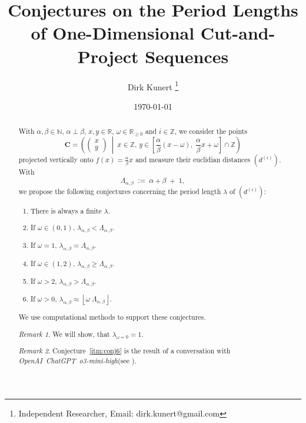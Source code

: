 \documentclass[11pt]{article}
\title{Conjectures on the Period Lengths of One-Dimensional Cut-and-Project Sequences}
\author{Dirk Kunert \thanks{Independent Researcher, Email: dirk.kunert@gmail.com}}
\date{\today}
\theoremstyle{remark}
\newtheorem{remark}{Remark}
\begin{document}
%
\newcommand{\showfigures}{true}
\newcommand{\todo}[1]{\textcolor{red}{TODO: {#1}}}
\newcommand{\langc}[0]{\mbox{C}\xspace}
\newcommand{\langp}[0]{\mbox{Python}\xspace}
\newcommand{\chat}[0]{\mbox{\emph{OpenAI ChatGPT o3-mini-high}}\xspace}
\newcommand{\function}[1]{\mbox{\texttt{#1}}\xspace}

\maketitle
%
\begin{abstract}
With $\alpha, \beta \in \mathbb{N}$, $\alpha \perp \beta$, $x, y \in \mathbb{R}$, $\omega \in \mathbb{R}_{\ge 0}$ and $i \in \mathbb{Z}$, we consider the points
%
\begin{equation}
\mathbf{C} 
= \left(
\begin{pmatrix} x \\ y \end{pmatrix}
\;\middle|\;
x \in \mathbb{Z},\,
y \in 
\left[\frac{\alpha}{\beta} (x - \omega),\; \frac{\alpha}{\beta} x + \omega\right] 
\cap \mathbb{Z}
\right)\label{eq:points}
\end{equation}
%
projected vertically onto $f(x) = \frac{\alpha}{\beta} x$ and measure their euclidian distances $\left( d^{(i)} \right)$.
%
With
\[
\Lambda_{\alpha, \beta} \;:=\; \alpha + \beta \;+\; 1,
\]
%
we propose the following conjectures concerning the period length $\lambda$ of $\left( d^{(i)} \right)$:
%
\begin{enumerate}
	\item \label{itm:conj1} There is always a finite $\lambda$.
 	\item \label{itm:conj2} If \(\omega \in (0,1)\), $\lambda_{\alpha, \beta} < \Lambda_{\alpha, \beta}$.
 	\item \label{itm:conj3} If \(\omega = 1\), $\lambda_{\alpha, \beta} = \Lambda_{\alpha, \beta}$.
 	\item \label{itm:conj4} If \(\omega \in (1,2)\), $\lambda_{\alpha, \beta} \ge \Lambda_{\alpha, \beta}$.
 	\item \label{itm:conj5} If \(\omega > 2\), $\lambda_{\alpha, \beta} > \Lambda_{\alpha, \beta}$.
 	\item \label{itm:conj6} If \(\omega > 0\), $\lambda_{\alpha, \beta} \approx \left\lfloor \omega \; \Lambda_{\alpha, \beta} \right\rfloor$.
\end{enumerate}
%
We use computational methods to support these conjectures.
%
\begin{remark}
We will show, that $\lambda_{\omega = 0} = 1$.
\end{remark}
%
\begin{remark}
Conjecture~\ref{itm:conj6} is the result of a conversation with \chat (see \cite{ChatGPT}).
\end{remark}
\end{abstract}
\end{document}
